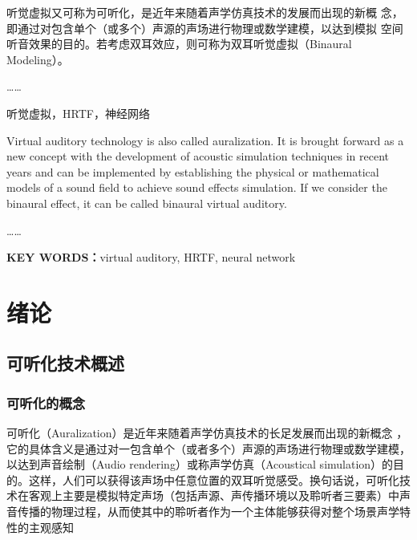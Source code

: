 \documentclass{nwputhesis}
\begin{document}
\maketitle

\newpage
\makeabstract

听觉虚拟又可称为可听化，是近年来随着声学仿真技术的发展而出现的新概
念，即通过对包含单个（或多个）声源的声场进行物理或数学建模，以达到模拟
空间听音效果的目的。若考虑双耳效应，则可称为双耳听觉虚拟（Binaural
Modeling）。

……

听觉虚拟，HRTF，神经网络

\makeEnabstract

Virtual auditory technology is also called auralization. It is brought forward as a new concept with the development of acoustic simulation techniques in recent years and can be implemented by establishing the physical or mathematical models of a sound field to achieve sound effects simulation. If we consider the binaural effect, it can be called binaural virtual auditory.

……

\noindent \textbf{ KEY WORDS：}virtual auditory, HRTF, neural network

\makecontent

\maketext

\section{绪论}
\subsection{可听化技术概述}
\subsubsection{可听化的概念}

可听化（Auralization）是近年来随着声学仿真技术的长足发展而出现的新概念\cite{Xu_2023_ICCV} \cite{li2021learning}，它的具体含义是通过对一包含单个（或者多个）声源的声场进行物理或数学建模，以达到声音绘制（Audio rendering）或称声学仿真（Acoustical simulation）的目的。这样，人们可以获得该声场中任意位置的双耳听觉感受。换句话说，可听化技术在客观上主要是模拟特定声场（包括声源、声传播环境以及聆听者三要素）中声音传播的物理过程，从而使其中的聆听者作为一个主体能够获得对整个场景声学特性的主观感知
\makespace
\end{document}
